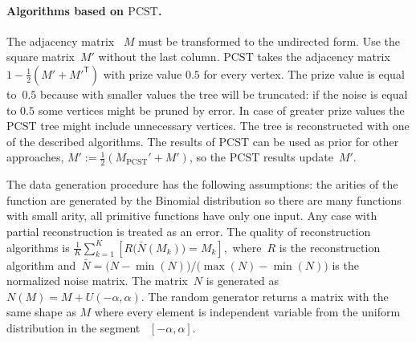 \documentclass[12pt]{article}
\begin{document}
\begin{table}[!htp]
    \caption{Quality of reconstruction algorithms with uniform noise near to $0.5$}
    \label{table:main_algs_local}
\end{table}


\paragraph{Algorithms based on $\text{PCST}$.}
The adjacency matrix~ $M$ must be transformed to the undirected form. Use the square matrix~$M'$ without the last column.  $\text{PCST}$ takes the adjacency matrix~$1 - \frac{1}{2}(M' + M'^{\mathsf{T}})$ with prize value $0.5$ for every vertex. %
The prize value is equal to~$0.5$ because with smaller values the tree will be truncated: if the noise is equal to $0.5$ some vertices might be pruned by error. In case of greater prize values the $\text{PCST}$ tree might include unnecessary vertices. The tree is reconstructed with one of the described algorithms. The results of $\text{PCST}$ can be used as prior for other approaches, $ M':=\frac{1}{2}(M_\text{PCST}' + M')$,
so the $\text{PCST}$ results update~$M'$.


The data generation procedure has the following assumptions: the arities of the function are generated by the Binomial distribution so there are many functions with small arity, all primitive functions have only one input. Any case with partial reconstruction is treated as an error. The quality of reconstruction algorithms is
$\frac{1}{K}\sum_{k=1}^K[R\bigl(\bar{N}(M_k)\bigr)=M_k],$%
where~$R$ is the reconstruction algorithm and~$\bar{N}=\bigl(N-\min(N)\bigr)/\bigl(\max(N)-\min(N)\bigr)$ is the normalized noise matrix. The matrix~$N$ is generated as~$N(M)=M+U(-\alpha,\alpha)$.
The random generator returns a matrix with the same shape as $M$ where every element is independent variable from the uniform distribution in the segment~ $[-\alpha,\alpha]$.
\end{document}
